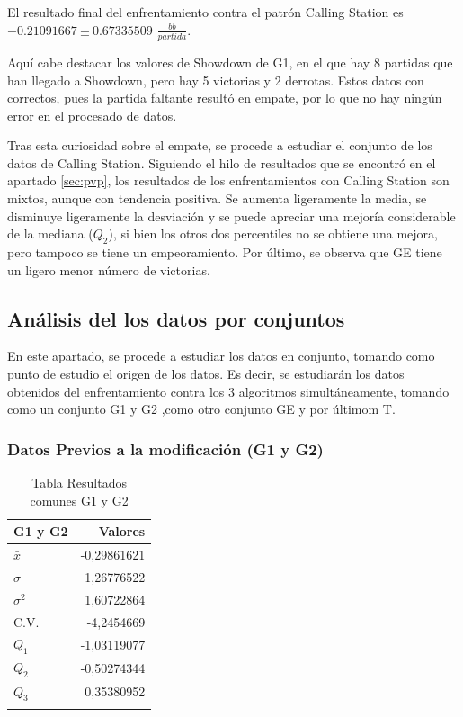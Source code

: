 El resultado final del enfrentamiento contra el patrón Calling Station es $-0.21091667\pm0.67335509$ $\frac{bb}{partida}$.

\vspace{5mm} %

Aquí cabe destacar los valores de Showdown de G1, en el que hay 8 partidas que han llegado a Showdown, pero hay 5 victorias y 2 derrotas. Estos datos con correctos, pues la partida faltante resultó en empate, por lo que no hay ningún error en el procesado de datos.

Tras esta curiosidad sobre el empate, se procede a estudiar el conjunto de los datos de Calling Station. Siguiendo el hilo de resultados que se encontró en el apartado \ref{sec:pvp}, los resultados de los enfrentamientos con Calling Station son mixtos, aunque con tendencia positiva. Se aumenta ligeramente la media, se disminuye ligeramente la desviación y se puede apreciar una mejoría considerable de la mediana ($Q_2$), si bien los otros dos percentiles no se obtiene una mejora, pero tampoco se tiene un empeoramiento.
Por último, se observa que GE tiene un ligero menor número de victorias.

\clearpage

\subsection{Análisis del los datos por conjuntos}

En este apartado, se procede a estudiar los datos en conjunto, tomando como punto de estudio el origen de los datos. Es decir, se estudiarán los datos obtenidos del enfrentamiento contra los 3 algoritmos simultáneamente, tomando como un conjunto G1 y G2 ,como otro conjunto GE y por últimom T.

\subsubsection{Datos Previos a la modificación (G1 y G2)}

\begin{longtable}[c]{lr}
\hline
G1 y G2 & Valores \\ \hline
$\bar{x}$& -0,29861621 \\ 
$\sigma$ & 1,26776522 \\ 
$\sigma^2$& 1,60722864 \\ 
C.V.& -4,2454669 \\ 
$Q_1$ & -1,03119077 \\ 
$Q_2$ & -0,50274344 \\ 
$Q_3$ & 0,35380952 \\ \hline
\caption{Tabla Resultados comunes G1 y G2}
\label{tab:AGP}
\end{longtable}

